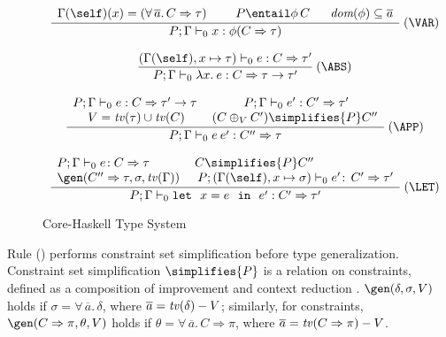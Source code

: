 \begin{figure}
\begin{mdframed}
\[ \begin{array}{cc}
      \displaystyle\frac
        {\begin{array}[t]{lll}
           \Gamma(\self)(x) = (\forall\,\overline{a}.\,C\Rightarrow \tau)\:\:\: & \:\:\:P \entail \phi\,C 
           & \:\:\:\dom{\phi} \subseteq \overline{a}
         \end{array}}
        {P;\Gamma \vdash_0 x: \phi (C \Rightarrow \tau)} \:(\VAR) \\ \\

	\displaystyle\frac
          {(\Gamma(\self),x \mapsto \tau) \vdash_0 e: C \Rightarrow \tau'}
	  {P;\Gamma \vdash_0 \lambda x.\:e: C\Rightarrow \tau \rightarrow \tau'} \:(\ABS)  \\ \\

	\displaystyle\frac
	  {\begin{array}[t]{cc}
             P;\Gamma \vdash_0 e: C \Rightarrow \tau' \rightarrow \tau\: &\:
             P;\Gamma \vdash_0 e': C' \Rightarrow \tau' \\
             V = \tv(\tau) \cup \tv(C) & (C \oplus_V C') \simplifies{P} C''
        \end{array}}
	{P;\Gamma \vdash_0 e\:e': C'' \Rightarrow \tau} \:(\APP) \\ \\

	\displaystyle\frac
	 {\begin{array}{ll}
            P;\Gamma \vdash_0 e\!:C \Rightarrow \tau & C \simplifies{P} C'' \\
            \gen(C'' \Rightarrow \tau,\sigma,\tv(\Gamma))\: & \:P;(\Gamma(\self),x \mapsto\sigma) \vdash_0 e'\!:\,C' \Rightarrow \tau'
          \end{array}}
	 {P;\Gamma \vdash_0 \mlet\ x=e\ \iin\ e': C' \Rightarrow\tau' } \:(\LET)
\end{array} \]
\end{mdframed} \vspace{-.2cm}
\caption{Core-Haskell Type System} 
\label{fig:core-haskell-type-system}
\end{figure}

Rule (\LET) performs constraint set simplification before type
generalization. Constraint set simplification $\simplifies{P}$ is a
relation on cons\-traints, defined as a composition of improvement and
context reduction \cite{JBCS-Ambiguity-and-constrained-polymorphism}.
$\gen(\delta,\sigma,V)$ holds if
  $\sigma=\forall\,\overline{a}.\,\delta$, where
  $\overline{a}=\text{\it tv\/}(\delta) - V$; similarly, for constraints, 
$\gen(C\Rightarrow\pi,\theta,V)$ holds if
$\theta=\forall\,\overline{a}.\,C\Rightarrow\pi$, where
$\overline{a}=\text{\it tv\/}(C\Rightarrow\pi) - V$. 

